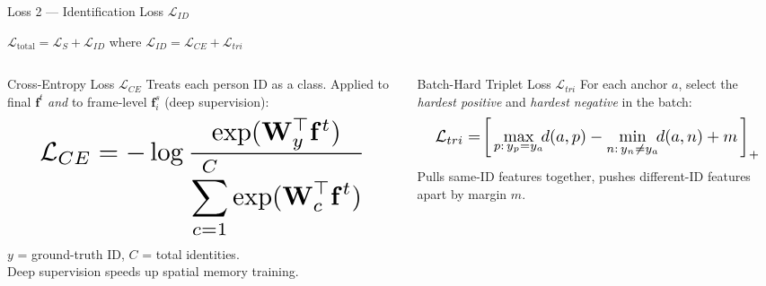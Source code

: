 \documentclass[aspectratio=169]{beamer}
\newcommand{\eq}[1]{\begin{equation*}#1\end{equation*}}
\begin{document}
\begin{frame}{Loss 2 --- Identification Loss $\mathcal{L}_{ID}$}
  \vspace{-0.8em}
  \begin{center}
    \footnotesize $\mathcal{L}_\text{total} = \mathcal{L}_S + \mathcal{L}_{ID}$
    \qquad where \qquad
    $\mathcal{L}_{ID} = \mathcal{L}_{CE} + \mathcal{L}_{tri}$
  \end{center}

  \begin{columns}[T]
      \begin{block}{Cross-Entropy Loss $\mathcal{L}_{CE}$}
        \scriptsize Treats each person ID as a class. Applied to final $\mathbf{f}^t$ \emph{and} to frame-level $\mathbf{f}^s_i$ (deep supervision):
        \eq{\resizebox{0.75\linewidth}{!}{$\displaystyle
          \mathcal{L}_{CE} = -\log \frac{\exp(\mathbf{W}_{y}^\top \mathbf{f}^t)}
                                        {\displaystyle\sum_{c=1}^{C} \exp(\mathbf{W}_{c}^\top \mathbf{f}^t)}
        $}}
        \scriptsize $y$ = ground-truth ID, $C$ = total identities.\\
        Deep supervision speeds up spatial memory training.
      \end{block}

      \begin{block}{Batch-Hard Triplet Loss $\mathcal{L}_{tri}$}
        \scriptsize For each anchor $a$, select the \emph{hardest positive} and \emph{hardest negative} in the batch:
        \eq{\resizebox{0.75\linewidth}{!}{$\displaystyle
          \mathcal{L}_{tri} = \!\left[\,
            \max_{\substack{p:\,y_p = y_a}} \!\!d(a,p)
            -
            \min_{\substack{n:\,y_n \neq y_a}} \!\!d(a,n)
            + m
          \,\right]_+
        $}}
        \scriptsize Pulls same-ID features together, pushes different-ID features apart by margin $m$.
      \end{block}
  \end{columns}
\end{frame}
\end{document}
